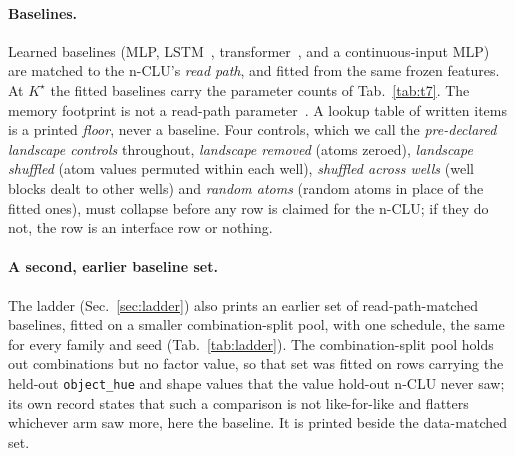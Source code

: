 \documentclass{article} %
\newcommand{\Kstar}{\ensuremath{K^{\star}}}
\begin{document}
\paragraph{Baselines.} Learned baselines (MLP, LSTM~\citep{hochreiter_long_1997}, transformer~\citep{vaswani_attention_2023}, and a
continuous-input MLP) are matched to the n-CLU's \emph{read path}, and fitted from the same
frozen features. At $\Kstar$ the fitted baselines carry the parameter counts of Tab.~\ref{tab:t7}.
The memory footprint is not a read-path parameter~\citep{borgeaud_improving_2022,khandelwal_generalization_2020,lample_large_2019}. A lookup table
of written items is a printed \emph{floor}, never a baseline. Four controls, which we call the \emph{pre-declared
landscape controls} throughout, \emph{landscape removed} (atoms zeroed), \emph{landscape shuffled} (atom values permuted within each well), \emph{shuffled across wells}
(well blocks dealt to other wells) and \emph{random atoms} (random atoms in place of the fitted ones), must collapse before any
row is claimed for the n-CLU; if they do not, the row is an interface row or nothing.

\paragraph{A second, earlier baseline set.} The ladder (Sec.~\ref{sec:ladder}) also prints an earlier set
of read-path-matched baselines, fitted on a smaller combination-split pool, %
with one schedule, the same for %
every family and seed (Tab.~\ref{tab:ladder}). %
The combination-split pool holds out combinations but no factor value, so that set was fitted on
rows carrying the held-out \texttt{object\_hue} and shape values that the value hold-out n-CLU never
saw; its own record states that such a comparison is not like-for-like and flatters whichever arm
saw more, here the baseline. It is printed beside the data-matched set.
\end{document}
